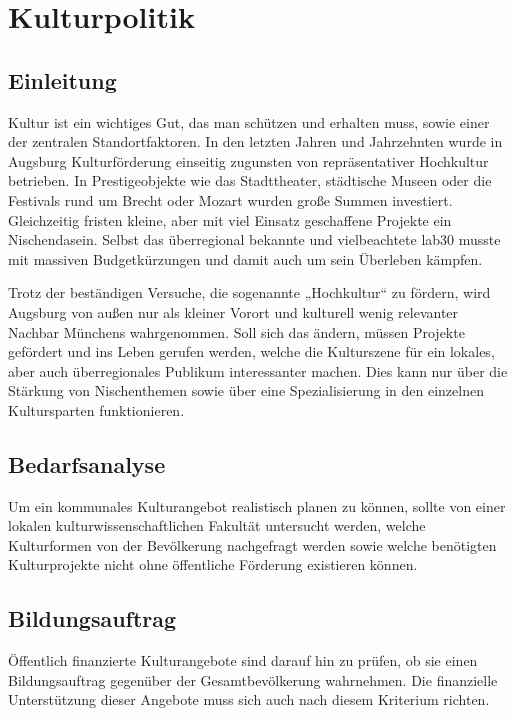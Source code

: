 \documentclass[a5paper, ngerman, 10pt]{scrbook}
\begin{document}
  \section{Kulturpolitik}
  \subsection{Einleitung}
   
   Kultur ist ein wichtiges Gut, das man schützen und erhalten muss, sowie 
   einer der zentralen Standortfaktoren. In den letzten Jahren und Jahrzehnten 
   wurde in Augsburg Kulturförderung einseitig zugunsten von repräsentativer 
   Hochkultur betrieben. In Prestigeobjekte wie das Stadttheater, städtische 
   Museen oder die Festivals rund um Brecht oder Mozart wurden große Summen 
   investiert. Gleichzeitig fristen kleine, aber mit viel Einsatz geschaffene 
   Projekte ein Nischendasein. Selbst das überregional bekannte und 
   vielbeachtete lab30 musste mit massiven Budgetkürzungen und damit auch um 
   sein Überleben kämpfen.
   
   Trotz der beständigen Versuche, die sogenannte „Hochkultur“ zu fördern, 
   wird Augsburg von außen nur als kleiner Vorort und kulturell wenig 
   relevanter Nachbar Münchens wahrgenommen. Soll sich das ändern, müssen 
   Projekte gefördert und ins Leben gerufen werden, welche die Kulturszene für 
   ein lokales, aber auch überregionales Publikum interessanter machen. Dies 
   kann nur über die Stärkung von Nischenthemen sowie über eine 
   Spezialisierung in den einzelnen Kultursparten funktionieren.
   
   \subsection{Bedarfsanalyse}
   
   Um ein kommunales Kulturangebot realistisch planen zu können, sollte von 
   einer lokalen kulturwissenschaftlichen Fakultät untersucht werden, welche 
   Kulturformen von der Bevölkerung nachgefragt werden sowie welche benötigten 
   Kulturprojekte nicht ohne öffentliche Förderung existieren können.
   
   \subsection{Bildungsauftrag}
   
   Öffentlich finanzierte Kulturangebote sind darauf hin zu prüfen, ob sie 
   einen Bildungsauftrag gegenüber der Gesamtbevölkerung wahrnehmen. Die 
   finanzielle Unterstützung dieser Angebote muss sich auch nach diesem 
   Kriterium richten.
   
\end{document}
